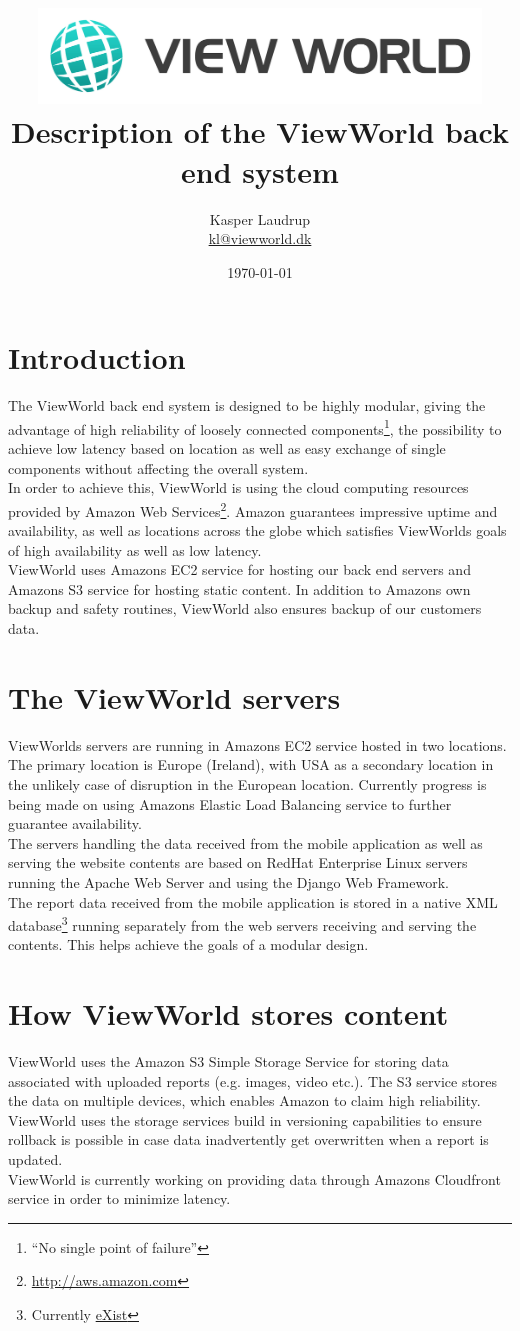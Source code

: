\documentclass[a4paper, 12pt, final]{article}
\title{
  \includegraphics[height=1in]{View_World_Logo.jpg}\\
  Description of the ViewWorld back end system
  }
\author{
  Kasper Laudrup\\
  \url{kl@viewworld.dk}
}
\date{\today}
\begin{document}
\maketitle

\newpage

\section{Introduction}
The ViewWorld back end system is designed to be highly modular, giving
the advantage of high reliability of loosely connected
components\footnote{``No single point of failure''}, the possibility to
achieve low latency based on location as well as easy exchange of
single components without affecting the overall system.\\
In order to achieve this, ViewWorld is using the cloud
computing resources provided by Amazon Web
Services\footnote{\href{http://aws.amazon.com}{http://aws.amazon.com}}.
Amazon guarantees impressive uptime and availability, as well as
locations across the globe which satisfies ViewWorlds goals of high
availability as well as low latency.\\
ViewWorld uses Amazons EC2 service for hosting our back end servers and
Amazons S3 service for hosting static content. In addition to Amazons
own backup and safety routines, ViewWorld also ensures backup of our
customers data.

\section{The ViewWorld servers}
ViewWorlds servers are running in Amazons EC2 service hosted in two
locations. The primary location is Europe (Ireland), with USA as a
secondary location in the unlikely case of disruption in the European
location. Currently progress is being made on using Amazons Elastic
Load Balancing service to further guarantee availability.\\
The servers handling the data received from the mobile application as
well as serving the website contents are based on RedHat Enterprise
Linux servers running the Apache Web Server and using the Django Web
Framework.\\
The report data received from the mobile application is stored in a
native XML database\footnote{Currently \href{exist-db.org}{eXist}}
running separately from the web servers receiving and serving the
contents. This helps achieve the goals of a modular design.

\section{How ViewWorld stores content}
ViewWorld uses the Amazon S3 Simple Storage Service for storing data
associated with uploaded reports (e.g. images, video etc.). The S3
service stores the data on multiple devices, which enables Amazon to
claim high reliability. ViewWorld uses the storage services build in
versioning capabilities to ensure rollback is possible in case data
inadvertently get overwritten when a report is updated.\\
ViewWorld is currently working on providing data through Amazons
Cloudfront service in order to minimize latency.
\end{document}
